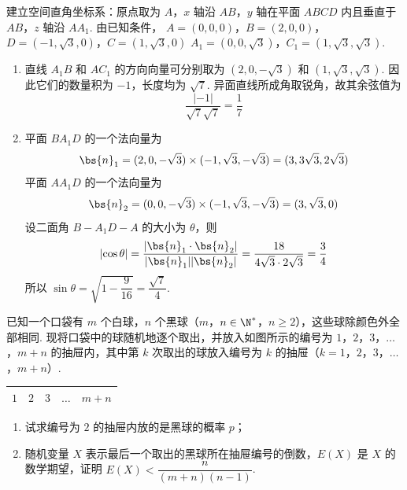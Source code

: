 \begin{solution}
建立空间直角坐标系：原点取为 \(A\)，\(x\) 轴沿 \(AB\)，\(y\) 轴在平面 \(ABCD\) 内且垂直于 \(AB\)，\(z\) 轴沿 \(AA_1\). 由已知条件，
\(A=(0,0,0)\)，\(B=(2,0,0)\)，\(D=(-1,\sqrt3,0)\)，\(C=(1,\sqrt3,0)\)
\(A_1=(0,0,\sqrt3)\)，\(C_1=(1,\sqrt3,\sqrt3)\).
\begin{enumerate}
\item 直线 \(A_1B\) 和 \(AC_1\) 的方向向量可分别取为 \((2,0,-\sqrt3)\) 和 \((1,\sqrt3,\sqrt3)\). 因此它们的数量积为 \(-1\)，长度均为 \(\sqrt7\). 异面直线所成角取锐角，故其余弦值为
\[
\dfrac{|-1|}{\sqrt7\sqrt7}=\dfrac17
\]
\item 平面 \(BA_1D\) 的一个法向量为
\[
\bs{n}_1=(2,0,-\sqrt3)\times(-1,\sqrt3,-\sqrt3)=(3,3\sqrt3,2\sqrt3)
\]
平面 \(AA_1D\) 的一个法向量为
\[
\bs{n}_2=(0,0,-\sqrt3)\times(-1,\sqrt3,-\sqrt3)=(3,\sqrt3,0)
\]
设二面角 \(B-A_1D-A\) 的大小为 \(\theta\)，则
\[
\left|\cos\theta\right|=\dfrac{|\bs{n}_1\cdot\bs{n}_2|}{|\bs{n}_1||\bs{n}_2|}=\dfrac{18}{4\sqrt3\cdot2\sqrt3}=\dfrac34
\]
所以 \(\sin\theta=\sqrt{1-\dfrac9{16}}=\dfrac{\sqrt7}{4}\).
\end{enumerate}
\end{solution}


\begin{problem}
已知一个口袋有 \(m\) 个白球，\(n\) 个黑球（\(m\)，\(n\in \N^*\)，\(n\ge 2\)），这些球除颜色外全部相同. 现将口袋中的球随机地逐个取出，并放入如图所示的编号为 \(1\)，\(2\)，\(3\)，\(\ldots\)，\(m+n\) 的抽屉内，其中第 \(k\) 次取出的球放入编号为 \(k\) 的抽屉（\(k=1\)，\(2\)，\(3\)，\(\ldots\)，\(m+n\)）.

\begin{center}
\begin{tabular}{|c|c|c|c|c|}
\hline
\(1\) & \(2\) & \(3\) & \(\ldots\) & \(m+n\) \\
\hline
\end{tabular}
\end{center}

\begin{enumerate}
\item 试求编号为 \(2\) 的抽屉内放的是黑球的概率 \(p\)；
\item 随机变量 \(X\) 表示最后一个取出的黑球所在抽屉编号的倒数，\(E(X)\) 是 \(X\) 的数学期望，证明 \(E(X)<\dfrac{n}{(m+n)(n-1)}\).
\end{enumerate}
\end{problem}

